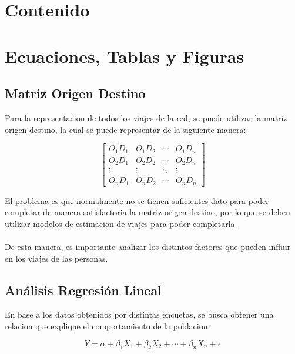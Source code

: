 \documentclass[12pt]{article} %
\begin{document}
\section{Contenido}

\section{Ecuaciones, Tablas y Figuras}

\subsection{Matriz Origen Destino}

Para la representacion de todos los viajes de la red, se puede utilizar la matriz origen destino, la cual se puede representar de la siguiente manera:

\begin{equation}
    \begin{bmatrix}
        O_{1}D_{1} & O_{1}D_{2} & \cdots & O_{1}D_{n} \\
        O_{2}D_{1} & O_{2}D_{2} & \cdots & O_{2}D_{n} \\
        \vdots & \vdots & \ddots & \vdots \\
        O_{n}D_{1} & O_{n}D_{2} & \cdots & O_{n}D_{n}
    \end{bmatrix}
\end{equation}

El problema es que normalmente no se tienen suficientes dato para poder completar de manera satisfactoria la matriz origen destino, por lo que se deben utilizar modelos de estimacion de viajes para poder completarla.
\\ \\
De esta manera, es importante analizar los distintos factores que pueden influir en los viajes de las personas.

\subsection{Análisis Regresión Lineal}

En base a los datos obtenidos por distintas encuetas, se busca obtener una relacion que explique el comportamiento de la poblacion:

\begin{equation}
    Y = \alpha + \beta_{1}X_{1} + \beta_{2}X_{2} + \cdots + \beta_{n}X_{n} + \epsilon
\end{equation}
\end{document}
